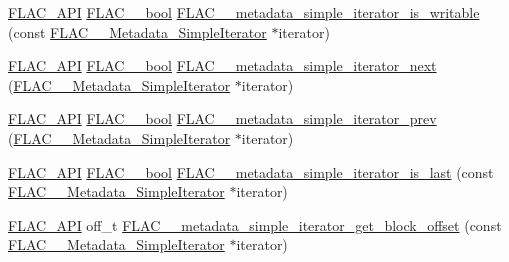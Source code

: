 \begin{DoxyCompactItemize}
\item 
\mbox{\hyperlink{group__flac__export_ga56ca07df8a23310707732b1c0007d6f5}{F\+L\+A\+C\+\_\+\+A\+PI}} \mbox{\hyperlink{ordinals_8h_a95103469f1cbd78b8cf250194985b34e}{F\+L\+A\+C\+\_\+\+\_\+bool}} \mbox{\hyperlink{group__flac__metadata__level1_gadc654c1361b53737bab20efa3e75a0fc}{F\+L\+A\+C\+\_\+\+\_\+metadata\+\_\+simple\+\_\+iterator\+\_\+is\+\_\+writable}} (const \mbox{\hyperlink{group__flac__metadata__level1_ga6accccddbb867dfc2eece9ee3ffecb3a}{F\+L\+A\+C\+\_\+\+\_\+\+Metadata\+\_\+\+Simple\+Iterator}} $\ast$iterator)
\item 
\mbox{\hyperlink{group__flac__export_ga56ca07df8a23310707732b1c0007d6f5}{F\+L\+A\+C\+\_\+\+A\+PI}} \mbox{\hyperlink{ordinals_8h_a95103469f1cbd78b8cf250194985b34e}{F\+L\+A\+C\+\_\+\+\_\+bool}} \mbox{\hyperlink{group__flac__metadata__level1_gacac860d14fc0ff37cc2c034d3f972320}{F\+L\+A\+C\+\_\+\+\_\+metadata\+\_\+simple\+\_\+iterator\+\_\+next}} (\mbox{\hyperlink{group__flac__metadata__level1_ga6accccddbb867dfc2eece9ee3ffecb3a}{F\+L\+A\+C\+\_\+\+\_\+\+Metadata\+\_\+\+Simple\+Iterator}} $\ast$iterator)
\item 
\mbox{\hyperlink{group__flac__export_ga56ca07df8a23310707732b1c0007d6f5}{F\+L\+A\+C\+\_\+\+A\+PI}} \mbox{\hyperlink{ordinals_8h_a95103469f1cbd78b8cf250194985b34e}{F\+L\+A\+C\+\_\+\+\_\+bool}} \mbox{\hyperlink{group__flac__metadata__level1_ga49f495dec0f44116d66e1b79356a1160}{F\+L\+A\+C\+\_\+\+\_\+metadata\+\_\+simple\+\_\+iterator\+\_\+prev}} (\mbox{\hyperlink{group__flac__metadata__level1_ga6accccddbb867dfc2eece9ee3ffecb3a}{F\+L\+A\+C\+\_\+\+\_\+\+Metadata\+\_\+\+Simple\+Iterator}} $\ast$iterator)
\item 
\mbox{\hyperlink{group__flac__export_ga56ca07df8a23310707732b1c0007d6f5}{F\+L\+A\+C\+\_\+\+A\+PI}} \mbox{\hyperlink{ordinals_8h_a95103469f1cbd78b8cf250194985b34e}{F\+L\+A\+C\+\_\+\+\_\+bool}} \mbox{\hyperlink{group__flac__metadata__level1_ga4dd81539fb698163209d05af13a2ec3c}{F\+L\+A\+C\+\_\+\+\_\+metadata\+\_\+simple\+\_\+iterator\+\_\+is\+\_\+last}} (const \mbox{\hyperlink{group__flac__metadata__level1_ga6accccddbb867dfc2eece9ee3ffecb3a}{F\+L\+A\+C\+\_\+\+\_\+\+Metadata\+\_\+\+Simple\+Iterator}} $\ast$iterator)
\item 
\mbox{\hyperlink{group__flac__export_ga56ca07df8a23310707732b1c0007d6f5}{F\+L\+A\+C\+\_\+\+A\+PI}} off\+\_\+t \mbox{\hyperlink{group__flac__metadata__level1_ga46e158a3f70c0e39db9c68a9ff9a2621}{F\+L\+A\+C\+\_\+\+\_\+metadata\+\_\+simple\+\_\+iterator\+\_\+get\+\_\+block\+\_\+offset}} (const \mbox{\hyperlink{group__flac__metadata__level1_ga6accccddbb867dfc2eece9ee3ffecb3a}{F\+L\+A\+C\+\_\+\+\_\+\+Metadata\+\_\+\+Simple\+Iterator}} $\ast$iterator)

\end{DoxyCompactItemize}
